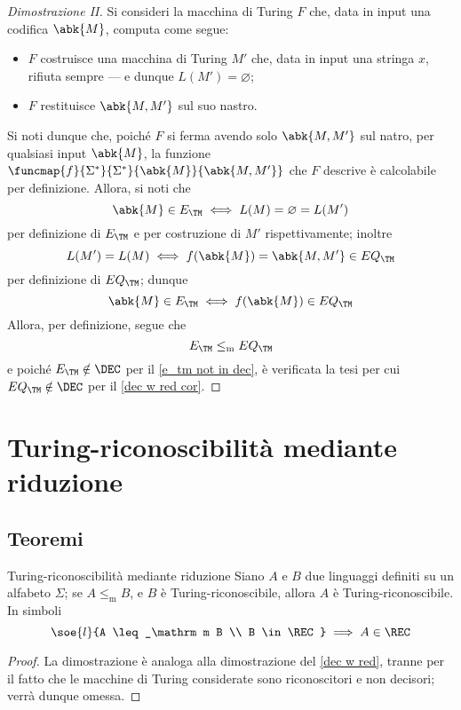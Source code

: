 \documentclass[a4paper, 12pt]{report}
\begin{document}
    \begin{proof}[Dimostrazione II]
        Si consideri la macchina di Turing $F$ che, data in input una codifica $\abk{M}$, computa come segue:

        \begin{itemize}
            \item $F$ costruisce una macchina di Turing $M'$ che, data in input una stringa $x$, rifiuta sempre --- e dunque $L(M') = \varnothing$;
            \item $F$ restituisce $\abk{M, M'}$ sul suo nastro.
        \end{itemize}
        
        Si noti dunque che, poiché $F$ si ferma avendo solo $\abk{M, M'}$ sul natro, per qualsiasi input $\abk{M}$, la funzione $\funcmap{f}{\Sigma^*}{\Sigma^*}{\abk{M}}{\abk{M, M'}}$ che $F$ descrive è calcolabile per definizione. Allora, si noti che $$\abk{M} \in E_\TM \iff L(M) = \varnothing = L(M')$$ per definizione di $E_\TM$ e per costruzione di $M'$ rispettivamente; inoltre $$L(M') = L(M) \iff f(\abk{M}) = \abk{M, M'} \in EQ_\TM$$ per definizione di $EQ_\TM$; dunque $$\abk{M} \in E_\TM \iff f(\abk{M}) \in EQ_\TM $$ Allora, per definizione, segue che $$E_\TM \leq_\mathrm m EQ_\TM$$ e poiché $E_\TM \notin \DEC$ per il \cref{e_tm not in dec}, è verificata la tesi per cui $EQ_\TM \notin \DEC$ per il \cref{dec w red cor}.
    \end{proof}

    \section{Turing-riconoscibilità mediante riduzione}

    \subsection{Teoremi}

    \begin{framedthm}[label={rec w red}]{Turing-riconoscibilità mediante riduzione}
        Siano $A$ e $B$ due linguaggi definiti su un alfabeto $\Sigma$; se $A \leq_\mathrm m B$, e $B$ è Turing-riconoscibile, allora $A$ è Turing-riconoscibile. In simboli $$\soe{l}{A \leq_\mathrm m B \\ B \in \REC} \implies A \in \REC$$
    \end{framedthm}

    \begin{proof}
        La dimostrazione è analoga alla dimostrazione del \cref{dec w red}, tranne per il fatto che le macchine di Turing considerate sono riconoscitori e non decisori; verrà dunque omessa.
    \end{proof}
\end{document}
